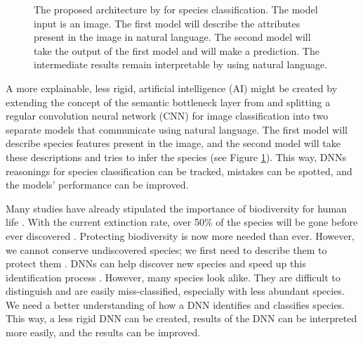 \documentclass[a4paper, 12pt, oneside]{book} %
\begin{document}
\begin{figure} [htbp]
    \centering
    \vspace{0cm}
    \caption[Proposed architecture]{The proposed architecture by \textcite{ishikawa_contextual_2021} for species classification. The model input is an image. The first model will describe the attributes present in the image in natural language. The second model will take the output of the first model and will make a prediction. The intermediate results remain interpretable by using natural language.}
    \label{fig:intro}
\end{figure}

A more explainable, less rigid, artificial intelligence (AI) might be created by extending the concept of the semantic bottleneck layer from \textcite{ishikawa_contextual_2021} and splitting a regular convolution neural network (CNN) for image classification into two separate models that communicate using natural language.
The first model will describe species features present in the image, and the second model will take these descriptions and tries to infer the species (see Figure \ref{fig:intro}).
This way, DNNs reasonings for species classification can be tracked, mistakes can be spotted, and the models' performance can be improved.


Many studies have already stipulated the importance of biodiversity for human life \autocite{pimentel_economic_1997, gowdy_value_1997, raffaelli_links_2010, joppa_biodiversity_2011, pimm_how_2018}.
With the current extinction rate, over 50\% of the species will be gone before ever discovered \autocite{lees_species_2015}.
Protecting biodiversity is now more needed than ever.
However, we cannot conserve undiscovered species; we first need to describe them to protect them \autocite{joppa_biodiversity_2011}.
DNNs can help discover new species and speed up this identification process \autocite{van_horn_inaturalist_2018}.
However, many species look alike.
They are difficult to distinguish and are easily miss-classified, especially with less abundant species.
We need a better understanding of how a DNN identifies and classifies species. 
This way, a less rigid DNN can be created, results of the DNN can be interpreted more easily, and the results can be improved.
\end{document}
